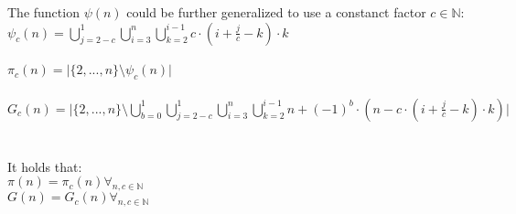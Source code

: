 \documentclass[12pt,ngerman]{article}
\theoremstyle{definition}
\begin{document}
The function $\psi(n)$ could be further generalized to use a constanct factor $c \in \mathbb{N}$:\\
$\psi_c(n) = \bigcup\limits_{j = 2-c}^{1} \bigcup\limits_{i = 3}^{n} \bigcup\limits_{k = 2}^{i-1} c \cdot (i + \frac{j}{c} - k) \cdot k$\\\\
$\pi_c(n) = \vert \{2,...,n\} \setminus \psi_c(n) \vert$\\\\
$G_c(n) = \vert \{2,...,n\} \setminus \bigcup\limits_{b = 0}^{1} \bigcup\limits_{j = 2-c}^{1} \bigcup\limits_{i = 3}^{n} \bigcup\limits_{k = 2}^{i-1} n + (-1)^b \cdot (n - c \cdot (i + \frac{j}{c} - k) \cdot k) \vert$\\\\\\
It holds that:\\
$\pi(n) = \pi_c(n) \forall_{n,c \in \mathbb{N}}$\\
$G(n) = G_c(n) \forall_{n,c \in \mathbb{N}}$
\end{document}
